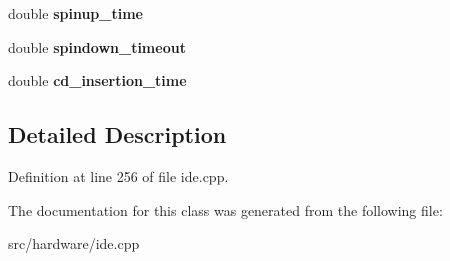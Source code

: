\begin{DoxyCompactItemize}
\item 
\hypertarget{classIDEController_a8fdce66e9764893c0d4bc4df2d03d80e}{double {\bfseries spinup\-\_\-time}}\label{classIDEController_a8fdce66e9764893c0d4bc4df2d03d80e}

\item 
\hypertarget{classIDEController_a88ffb339927b63d3bf7acdfa4055bb7a}{double {\bfseries spindown\-\_\-timeout}}\label{classIDEController_a88ffb339927b63d3bf7acdfa4055bb7a}

\item 
\hypertarget{classIDEController_a783a444006b92bb95370f2976cd1239f}{double {\bfseries cd\-\_\-insertion\-\_\-time}}\label{classIDEController_a783a444006b92bb95370f2976cd1239f}

\end{DoxyCompactItemize}


\subsection{Detailed Description}


Definition at line 256 of file ide.\-cpp.



The documentation for this class was generated from the following file\-:\begin{DoxyCompactItemize}
\item 
src/hardware/ide.\-cpp\end{DoxyCompactItemize}
